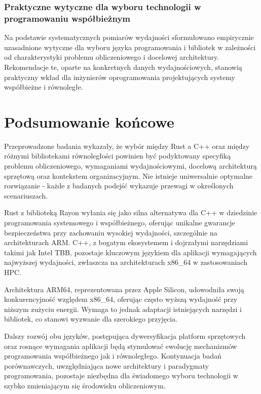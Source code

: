 \subsubsection{Praktyczne wytyczne dla wyboru technologii w programowaniu współbieżnym}

Na podstawie systematycznych pomiarów wydajności sformułowano empirycznie uzasadnione wytyczne dla wyboru języka programowania i bibliotek w zależności od charakterystyki problemu obliczeniowego i docelowej architektury. Rekomendacje te, oparte na konkretnych danych wydajnościowych, stanowią praktyczny wkład dla inżynierów oprogramowania projektujących systemy współbieżne i równoległe.

\section{Podsumowanie końcowe}

Przeprowadzone badania wykazały, że wybór między Rust a C++ oraz między różnymi bibliotekami równoległości powinien być podyktowany specyfiką problemu obliczeniowego, wymaganiami wydajnościowymi, docelową architekturą sprzętową oraz kontekstem organizacyjnym. Nie istnieje uniwersalnie optymalne rozwiązanie - każde z badanych podejść wykazuje przewagi w określonych scenariuszach.

Rust z biblioteką Rayon wyłania się jako silna alternatywa dla C++ w dziedzinie programowania systemowego i współbieżnego, oferując unikalne gwarancje bezpieczeństwa przy zachowaniu wysokiej wydajności, szczególnie na architekturach ARM. C++, z bogatym ekosystemem i dojrzałymi narzędziami takimi jak Intel TBB, pozostaje kluczowym językiem dla aplikacji wymagających najwyższej wydajności, zwłaszcza na architekturach x86\_64 w zastosowaniach HPC.

Architektura ARM64, reprezentowana przez Apple Silicon, udowodniła swoją konkurencyjność względem x86\_64, oferując często wyższą wydajność przy niższym zużyciu energii. Wymaga to jednak adaptacji istniejących narzędzi i bibliotek, co stanowi wyzwanie dla szerokiego przyjęcia.

Dalszy rozwój obu języków, postępująca dywersyfikacja platform sprzętowych oraz rosnące wymagania aplikacji będą stymulować ewolucję mechanizmów programowania współbieżnego jak i równoległego. Kontynuacja badań porównawczych, uwzględniająca nowe architektury i paradygmaty programowania, pozostaje niezbędna dla świadomego wyboru technologii w szybko zmieniającym się środowisku obliczeniowym.


